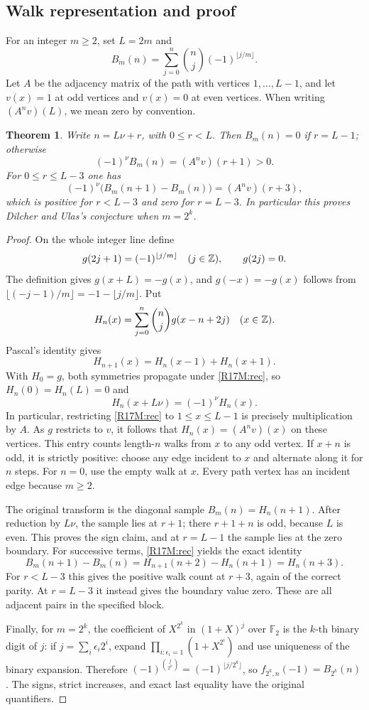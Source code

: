 \documentclass[11pt,a4paper]{article}
\newtheorem{SourceRbhMtheorem}{Theorem}
\begin{document}
\subsection{Walk representation and proof}
For an integer \(m\ge2\), set \(L=2m\) and
\[
 B_m(n)=\sum_{j=0}^{n}\binom nj(-1)^{\lfloor j/m\rfloor}.
\]
Let \(A\) be the adjacency matrix of the path with vertices \(1,\dots,L-1\), and let \(v(x)=1\) at odd vertices and \(v(x)=0\) at even vertices. When writing \((A^n v)(L)\), we mean zero by convention.

\begin{SourceRbhMtheorem}\label{R17M:main}
Write \(n=L\nu+r\), with \(0\le r<L\). Then \(B_m(n)=0\) if \(r=L-1\); otherwise
\[
  (-1)^\nu B_m(n)=(A^n v)(r+1)>0.
\]
For \(0\le r\le L-3\) one has
\[
  (-1)^\nu\bigl(B_m(n+1)-B_m(n)\bigr)=(A^n v)(r+3),
\]
which is positive for \(r<L-3\) and zero for \(r=L-3\). In particular this proves Dilcher and Ulas's conjecture when \(m=2^k\).
\end{SourceRbhMtheorem}

\begin{proof}
On the whole integer line define
\[
 g(2j+1)=(-1)^{\lfloor j/m\rfloor}\quad(j\in\mathbb Z),\qquad g(2j)=0 .
\]
The definition gives \(g(x+L)=-g(x)\), and \(g(-x)=-g(x)\) follows from
\(\lfloor(-j-1)/m\rfloor=-1-\lfloor j/m\rfloor\). Put
\[
 H_n(x)=\sum_{j=0}^n \binom nj g(x-n+2j) \quad(x\in\mathbb Z).
\]
Pascal's identity gives
\begin{equation}\label{R17M:rec}
 H_{n+1}(x)=H_n(x-1)+H_n(x+1).
\end{equation}
With \(H_0=g\), both symmetries propagate under \eqref{R17M:rec}, so \(H_n(0)=H_n(L)=0\) and
\[
 H_n(x+L\nu)=(-1)^\nu H_n(x).
\]
In particular, restricting \eqref{R17M:rec} to \(1\le x\le L-1\) is precisely multiplication by \(A\). As \(g\) restricts to \(v\), it follows that \(H_n(x)=(A^n v)(x)\) on these vertices. This entry counts length-\(n\) walks from \(x\) to any odd vertex. If \(x+n\) is odd, it is strictly positive: choose any edge incident to \(x\) and alternate along it for \(n\) steps. For \(n=0\), use the empty walk at \(x\). Every path vertex has an incident edge because \(m\ge2\).

The original transform is the diagonal sample \(B_m(n)=H_n(n+1)\). After reduction by \(L\nu\), the sample lies at \(r+1\); there \(r+1+n\) is odd, because \(L\) is even. This proves the sign claim, and at \(r=L-1\) the sample lies at the zero boundary.
For successive terms, \eqref{R17M:rec} yields the exact identity
\[
 B_m(n+1)-B_m(n)=H_{n+1}(n+2)-H_n(n+1)=H_n(n+3).
\]
For \(r<L-3\) this gives the positive walk count at \(r+3\), again of the correct parity. At \(r=L-3\) it instead gives the boundary value zero. These are all adjacent pairs in the specified block.

Finally, for \(m=2^k\), the coefficient of \(X^{2^k}\) in \((1+X)^j\) over \(\mathbb F_2\) is the \(k\)-th binary digit of \(j\): if \(j=\sum_i \epsilon_i 2^i\), expand \(\prod_{i:\epsilon_i=1}(1+X^{2^i})\) and use uniqueness of the binary expansion. Therefore \((-1)^{\binom{j}{2^k}}=(-1)^{\lfloor j/2^k\rfloor}\), so \(f_{2^k,n}(-1)=B_{2^k}(n)\). The signs, strict increases, and exact last equality have the original quantifiers.
\end{proof}
\end{document}
